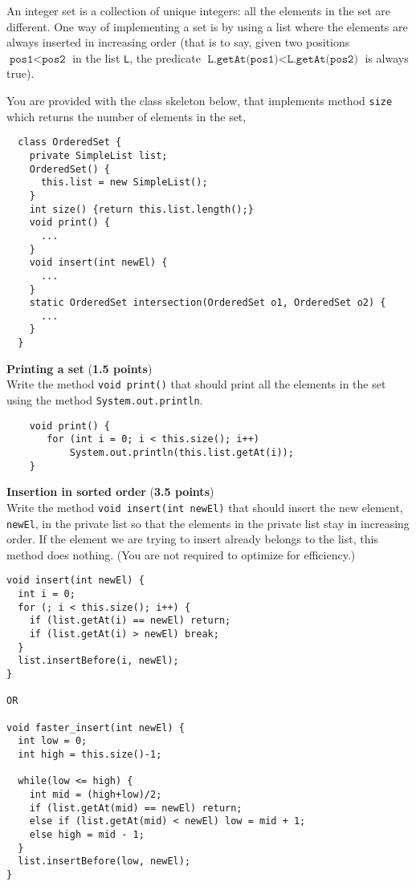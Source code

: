 \documentclass[correction]{exercices}
\begin{document}
An integer set is a collection of unique integers: all the elements
in the set are different. One way of implementing a set
is by using a list where the elements are always inserted
in increasing order (that is to say, given two
positions $\texttt{pos1} < \texttt{pos2}$ in the list \verb!L!,
the predicate $\texttt{L.getAt(pos1)} < \texttt{L.getAt(pos2)}$ is
always true).

You are provided with the class skeleton below, that implements
method \verb!size! which returns the number of elements in the set,
\begin{verbatim}
  class OrderedSet {
    private SimpleList list;
    OrderedSet() {
      this.list = new SimpleList();
    }
    int size() {return this.list.length();}
    void print() {
      ...
    }
    void insert(int newEl) {
      ...
    }
    static OrderedSet intersection(OrderedSet o1, OrderedSet o2) {
      ...
    }
  }
\end{verbatim}

\begin{question} \textbf{Printing a set} (\textbf{1.5 points}) \\
  Write the method \verb!void print()! that should print all the elements
  in the set using the method \verb!System.out.println!.
\begin{correction}
\begin{verbatim}
    void print() {
       for (int i = 0; i < this.size(); i++)
           System.out.println(this.list.getAt(i));
    }
\end{verbatim}
\end{correction}
\end{question}

\begin{question} \textbf{Insertion in sorted order} (\textbf{3.5 points}) \\
  Write the method \verb!void insert(int newEl)! that should insert the new
  element, \verb!newEl!, in the private list so that the elements in the private
  list stay in increasing order. If the element we are trying to insert already
  belongs to the list, this method does nothing. (You are not required to
  optimize for efficiency.)
\begin{correction}
\begin{verbatim}
void insert(int newEl) {
  int i = 0;
  for (; i < this.size(); i++) {
    if (list.getAt(i) == newEl) return;
    if (list.getAt(i) > newEl) break;
  }
  list.insertBefore(i, newEl);
}

OR

void faster_insert(int newEl) {
  int low = 0;
  int high = this.size()-1;

  while(low <= high) {
    int mid = (high+low)/2;
    if (list.getAt(mid) == newEl) return;
    else if (list.getAt(mid) < newEl) low = mid + 1;
    else high = mid - 1;
  }
  list.insertBefore(low, newEl);
}
\end{verbatim}
\end{correction}
\end{question}
\end{document}
